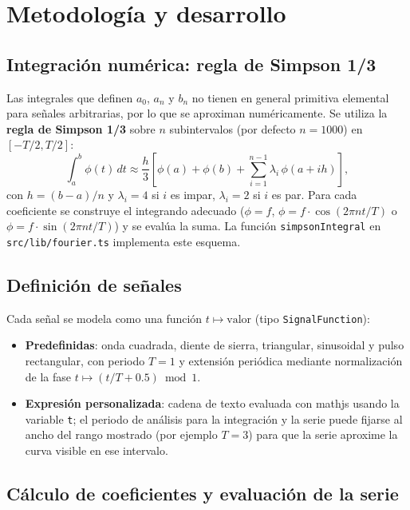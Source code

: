 \documentclass[12pt,a4paper]{article}
\begin{document}
\section{Metodología y desarrollo}

\subsection{Integración numérica: regla de Simpson 1/3}

Las integrales que definen \(a_0\), \(a_n\) y \(b_n\) no tienen en general primitiva elemental para señales arbitrarias, por lo que se aproximan numéricamente. Se utiliza la \textbf{regla de Simpson 1/3} sobre \(n\) subintervalos (por defecto \(n=1000\)) en \([-T/2, T/2]\):
\begin{equation}
  \int_a^b \phi(t)\,dt \approx \frac{h}{3}\left[ \phi(a) + \phi(b) + \sum_{i=1}^{n-1} \lambda_i\,\phi(a+ih) \right],
\end{equation}
con \(h = (b-a)/n\) y \(\lambda_i = 4\) si \(i\) es impar, \(\lambda_i = 2\) si \(i\) es par. Para cada coeficiente se construye el integrando adecuado (\(\phi = f\), \(\phi = f\cdot\cos(2\pi n t/T)\) o \(\phi = f\cdot\sin(2\pi n t/T)\)) y se evalúa la suma. La función \texttt{simpsonIntegral} en \texttt{src/lib/fourier.ts} implementa este esquema.

\subsection{Definición de señales}

Cada señal se modela como una función \(t \mapsto \text{valor}\) (tipo \texttt{SignalFunction}):
\begin{itemize}
  \item \textbf{Predefinidas}: onda cuadrada, diente de sierra, triangular, sinusoidal y pulso rectangular, con periodo \(T=1\) y extensión periódica mediante normalización de la fase \(t \mapsto (t/T + 0.5) \bmod 1\).
  \item \textbf{Expresión personalizada}: cadena de texto evaluada con mathjs usando la variable \texttt{t}; el periodo de análisis para la integración y la serie puede fijarse al ancho del rango mostrado (por ejemplo \(T=3\)) para que la serie aproxime la curva visible en ese intervalo.
\end{itemize}

\subsection{Cálculo de coeficientes y evaluación de la serie}
\end{document}
